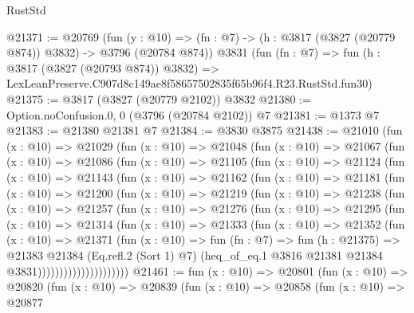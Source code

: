 \begin{lexlean}{RustStd}
\begin{coremodule}
@21371 := @20769
    (fun (y : @10) => (fn : @7) -> (h : @3817 (@3827 (@20779 @874)) @3832) -> @3796 (@20784 @874))
    @3831
    (fun (fn : @7) =>
    fun (h : @3817 (@3827 (@20793 @874)) @3832) =>
    LexLeanPreserve.C907d8c149ae8f58657502835f65b96f4.R23.RustStd.fun30)
@21375 := @3817 (@3827 (@20779 @2102)) @3832
@21380 := Option.noConfusion.{0, 0} (@3796 (@20784 @2102)) @7
@21381 := @1373 @7
@21383 := @21380 @21381 @7
@21384 := @3830 @3875
@21438 := @21010
    (fun (x : @10) =>
    @21029
      (fun (x : @10) =>
      @21048
        (fun (x : @10) =>
        @21067
          (fun (x : @10) =>
          @21086
            (fun (x : @10) =>
            @21105
              (fun (x : @10) =>
              @21124
                (fun (x : @10) =>
                @21143
                  (fun (x : @10) =>
                  @21162
                    (fun (x : @10) =>
                    @21181
                      (fun (x : @10) =>
                      @21200
                        (fun (x : @10) =>
                        @21219
                          (fun (x : @10) =>
                          @21238
                            (fun (x : @10) =>
                            @21257
                              (fun (x : @10) =>
                              @21276
                                (fun (x : @10) =>
                                @21295
                                  (fun (x : @10) =>
                                  @21314
                                    (fun (x : @10) =>
                                    @21333
                                      (fun (x : @10) =>
                                      @21352
                                        (fun (x : @10) =>
                                        @21371
                                          (fun (x : @10) =>
                                          fun (fn : @7) =>
                                          fun (h : @21375) =>
                                          @21383
                                            @21384
                                            (Eq.refl.{2} (Sort 1) @7)
                                            (heq_of_eq.{1}
                                              @3816
                                              @21381
                                              @21384
                                              @3831)))))))))))))))))))))
@21461 := fun (x : @10) =>
  @20801
    (fun (x : @10) =>
    @20820
      (fun (x : @10) =>
      @20839
        (fun (x : @10) =>
        @20858
          (fun (x : @10) =>
          @20877

\end{coremodule}
\end{lexlean}
